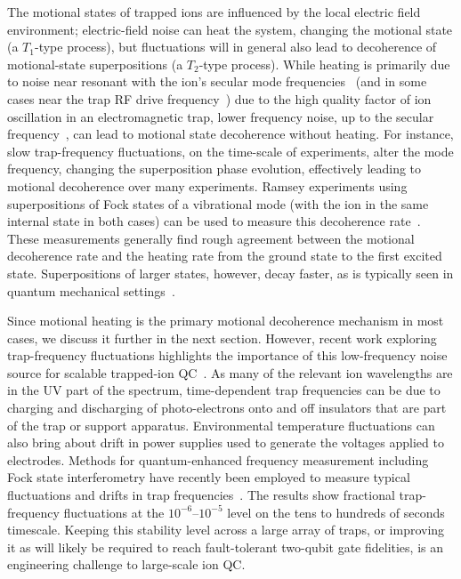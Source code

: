 \documentclass[%
12pt,
 amsmath,amssymb,
]{revtex4-2}
\begin{document}
The motional states of trapped ions are influenced by the local electric field environment; electric-field noise can heat the system, changing the motional state (a $T_{1}$-type process), but fluctuations will in general also lead to decoherence of motional-state superpositions (a $T_{2}$-type process).  While heating is primarily due to noise near resonant with the ion's secular mode frequencies~\cite{brownnutt_2015} (and in some cases near the trap RF drive frequency~\cite{blakestad_junction_2009,sedlacek_tnoise_2018}) due to the high quality factor of ion oscillation in an electromagnetic trap, lower frequency noise, up to the secular frequency~\cite{PhysRevA.93.043415_2016}, can lead to motional state decoherence without heating.  For instance, slow trap-frequency fluctuations, on the time-scale of experiments, alter the mode frequency, changing the superposition phase evolution, effectively leading to motional decoherence over many experiments.  Ramsey experiments using superpositions of Fock states of a vibrational mode (with the ion in the same internal state in both cases) can be used to measure this decoherence rate~\cite{PhysRevA.62.053807_2000,innsbruck_decoherence_2003,oxford_decoherence_2007,PhysRevA.93.043415_2016}.  These measurements generally find rough agreement between the motional decoherence rate and the heating rate from the ground state to the first excited state.  Superpositions of larger states, however, decay faster, as is typically seen in quantum mechanical settings~\cite{PhysRevA.62.053807_2000,brownnutt_2015}.

Since motional heating is the primary motional decoherence mechanism in most cases, we discuss it further in the next section.  However, recent work exploring trap-frequency fluctuations highlights the importance of this low-frequency noise source for scalable trapped-ion QC~\cite{nist_gate_2016}.  As many of the relevant ion wavelengths are in the UV part of the spectrum, time-dependent trap frequencies can be due to charging and discharging of photo-electrons onto and off insulators that are part of the trap or support apparatus.  Environmental temperature fluctuations can also bring about drift in power supplies used to generate the voltages applied to electrodes.   Methods for quantum-enhanced frequency measurement including Fock state interferometry have recently been employed to measure typical fluctuations and drifts in trap frequencies~\cite{schmidt_et_al_fock_state_measurement_2018,nist_fock_interferometry_2018}.  The results show fractional trap-frequency fluctuations at the $10^{-6}$--$10^{-5}$ level on the tens to hundreds of seconds timescale.  Keeping this stability level across a large array of traps, or improving it as will likely be required to reach fault-tolerant two-qubit gate fidelities, is an engineering challenge to large-scale ion QC.
\end{document}
